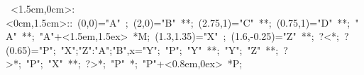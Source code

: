 
%

\hbox{
\xy    <1.5cm,0cm>:<0cm,1.5cm>::
       (0,0)="A" ; (2,0)="B" **\dir{-};
       (2.75,1)="C" **\dir{-}; (0.75,1)="D" **\dir{-}; "A" **\dir{-};
       "A"+<1.5em,1.5ex> *{M};
       (1.3,1.35)="X" ; (1.6,-0.25)="Z" **\dir{ }; ?<*\dir{<};  ?(0.65)="P"; 
       {"X";"Z":"A";"B",x}="Y"; "P"; "Y" **; 
       "Y"; "Z" **\dir{-}; ?>*\dir{>}; "P"; "X" **\dir{-}; ?>*\dir{>};
       "P" *{\bullet}; "P"+<0.8em,0ex> *{P};
       \endxy}
	   

